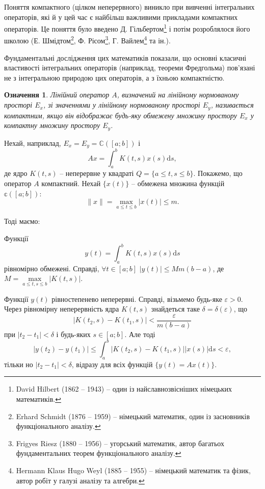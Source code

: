 \documentclass[14pt,twoside]{extreport}
\theoremstyle{mystyle}
\newtheorem{dfn}{Означення}
\numberwithin{equation}{chapter}
\newcommand{\cab}{\mathbb{C}([a; b])}
\begin{document}
Поняття компактного (цілком неперервного) виникло при вивченні інтегральних операторів, які й у цей час є найбільш важливими прикладами компактних операторів. Це поняття було введено Д. Гільбертом\footnote{David Hilbert (1862 -- 1943) -- один із найславнозвісніших німецьких математиків.} і потім розроблялося його школою (Е. Шмідтом\footnote{Erhard Schmidt (1876 -- 1959) -- німецький математик, один із засновників функціонального аналізу.}, Ф. Рісом\footnote{Frigyes Riesz (1880 -- 1956) -- угорський математик, автор багатьох фундаментальних теорем функціонального аналізу.}, Г. Вайлем\footnote{Hermann Klaus Hugo Weyl (1885 -- 1955) -- німецький математик та фізик, автор робіт у галузі аналізу та алгебри.} та ін.).

Фундаментальні дослідження цих математиків показали, що основні класичні властивості інтегральних операторів (наприклад, теореми Фредгольма) пов'язані не з інтегральною природою цих операторів, а з їхньою компактністю.

\begin{dfn}
	Лінійний оператор $A$, визначений на лінійному нормованому просторі $E_x$, зі значеннями у лінійному нормованому просторі $E_y$, називається компактним, якщо він відображає будь-яку обмежену множину простору $E_x$ у компактну множину простору $E_y$.
\end{dfn}
Нехай, наприклад, $E_x = E_y = \cab$ і
\[
Ax = \int_{a}^{b} K(t, s) x(s) \mathrm{d}s,
\]
де ядро $K(t, s)$ -- неперервне у квадраті $Q=\{a \leqslant t, s \leqslant b\}$. Покажемо, що оператор $A$ компактний. Нехай $\{x(t)\}$ -- обмежена множина функцій $\mathbb{c}([a; b])$:
\[
\|x\|=\max\limits_{a\leqslant t \leqslant b} |x(t)| \leqslant m.
\]

Тоді маємо:

Функції
\[
y(t) = \int_{a}^{b} K(t, s) x(s) \mathrm{d}s
\]
рівномірно обмежені. Справді, $\forall t \in [a; b]$ $|y(t)| \leqslant Mm(b-a)$, де $M = \max\limits_{a\leqslant t, s \leqslant b} |K(t, s)|$.

Функції $y(t)$ рівностепенево неперервні. Справді, візьмемо будь-яке $\varepsilon > 0$. Через рівномірну неперервність ядра $K(t, s)$ знайдеться таке $\delta = \delta (\varepsilon)$, що
\[
|K(t_2, s) - K(t_1, s)| < \dfrac{\varepsilon}{m(b-a)}
\]
при $|t_2 - t_1|<\delta$ і будь-яких $s \in [a; b]$. Але тоді
\[
|y(t_2) - y(t_1)| \leqslant \int_{a}^{b} |K(t_2, s) - K(t_1, s)| | x(s)| \mathrm{d}s < \varepsilon,
\]
тільки но $|t_2 - t_1| < \delta$, відразу для всіх функцій $\{y(t)=Ax(t)\}$.
\end{document}
